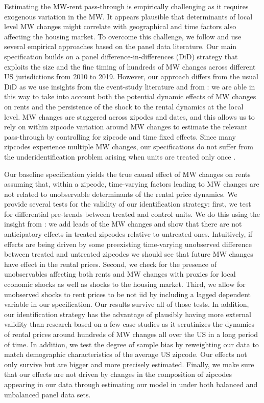Estimating the MW-rent pass-through is empirically challenging as it requires exogenous variation 
in the MW. It appears plausible that determinants of local level MW changes might correlate with 
geographical and time factors also affecting the housing market. To overcome this challenge, we 
follow \textcite{MeerWest2016} and use several empirical approaches based on the panel data 
literature. Our main specification builds on a panel difference-in-differences (DiD) strategy 
that exploits the size and the fine timing of hundreds of MW changes across different US jurisdictions 
from 2010 to 2019. However, our approach differs from the usual DiD as we use insights from the 
event-study literature and from \textcite{ArellanoBond1991}: we are able in this way to take into 
account both the potential dynamic effects of MW changes on rents and the persistence of the shock 
to the rental dynamics at the local level. MW changes are staggered across zipodes and dates, and 
this allows us to rely on within zipcode variation around MW changes to estimate the relevant 
pass-through by controlling for zipcode and time fixed effects. Since many zipcodes experience 
multiple MW changes, our specifications do not suffer from the underidentification problem arising 
when units are treated only once \parencite{BorusyakJaravel2017}.

Our baseline specification yields the true causal effect of MW changes on rents assuming that, 
within a zipcode, time-varying factors leading to MW changes are not related to unobservable 
determinants of the rental price dynamics. We provide several tests for the validity of our 
identification strategy: first, we test for differential pre-trends between treated and control 
units. We do this using the insight from \textcite{granger1969investigating}: we add leads of the 
MW changes and show that there are not anticipatory effects in treated zipcodes relative to 
untreated ones. Intuitively, if effects are being driven by some preexisting time-varying 
unobserved difference between treated and untreated zipcodes we should see that future MW changes 
have effect in the rental prices. Second, we check for the presence of unobservables affecting both 
rents and MW changes with proxies for local economic shocks as well as shocks to the housing market. 
Third, we allow for unobserved shocks to rent prices to be not iid by including a lagged dependent 
variable in our specification. Our results survive all of those tests. In addition, our identification 
strategy has the advantage of plausibly having more external validity than research based on a few 
case studies as it scrutinizes the dynamics of rental prices around hundreds of MW changes all over 
the US in a long period of time. In addition, we test the degree of sample bias by reweighting our 
data to match demographic characteristics of the average US zipcode. Our effects not only survive 
but are bigger and more precisely estimated. Finally, we make sure that our effects are not driven 
by changes in the composition of zipcodes appearing in our data through estimating our model in 
under both balanced and unbalanced panel data sets. 

